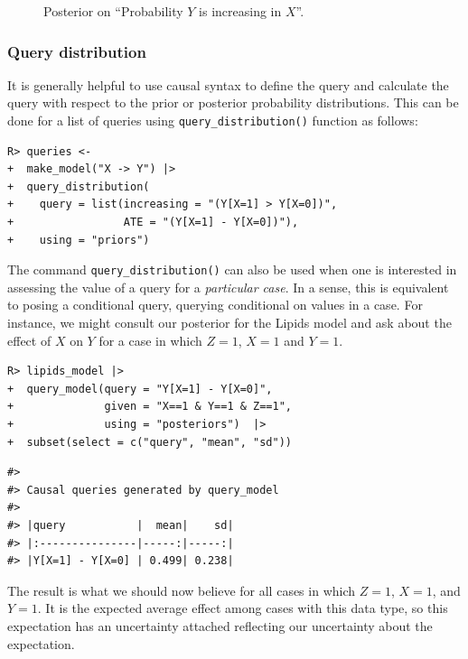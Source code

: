 \documentclass[
  11pt,
  article]{jss}
\begin{document}
\begin{figure}[t]


\caption{\label{fig-posterior-dist}Posterior on ``Probability \(Y\) is
increasing in \(X\)''.}

\end{figure}%

\FloatBarrier

\subsubsection{Query distribution}\label{query-distribution}

It is generally helpful to use causal syntax to define the query and
calculate the query with respect to the prior or posterior probability
distributions. This can be done for a list of queries using
\texttt{query\_distribution()} function as follows:

\begin{verbatim}
R> queries <- 
+  make_model("X -> Y") |> 
+  query_distribution(
+    query = list(increasing = "(Y[X=1] > Y[X=0])",
+                 ATE = "(Y[X=1] - Y[X=0])"), 
+    using = "priors")
\end{verbatim}

The command \texttt{query\_distribution()} can also be used when one is
interested in assessing the value of a query for a \emph{particular
case}. In a sense, this is equivalent to posing a conditional query,
querying conditional on values in a case. For instance, we might consult
our posterior for the Lipids model and ask about the effect of \(X\) on
\(Y\) for a case in which \(Z=1\), \(X=1\) and \(Y=1\).

\begin{verbatim}
R> lipids_model |>
+  query_model(query = "Y[X=1] - Y[X=0]",
+              given = "X==1 & Y==1 & Z==1",
+              using = "posteriors")  |> 
+  subset(select = c("query", "mean", "sd"))
\end{verbatim}

\begin{verbatim}
#> 
#> Causal queries generated by query_model
#> 
#> |query           |  mean|    sd|
#> |:---------------|-----:|-----:|
#> |Y[X=1] - Y[X=0] | 0.499| 0.238|
\end{verbatim}

The result is what we should now believe for all cases in which \(Z=1\),
\(X=1\), and \(Y=1\). It is the expected average effect among cases with
this data type, so this expectation has an uncertainty attached
reflecting our uncertainty about the expectation.
\end{document}
